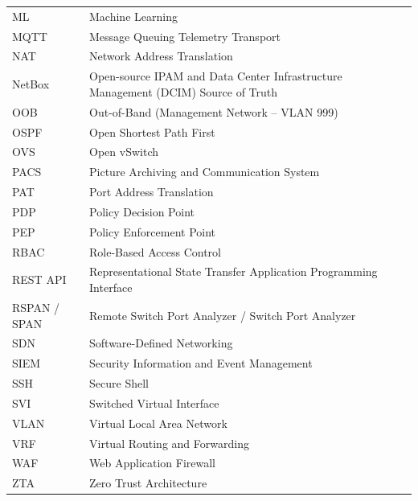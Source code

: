 \begin{longtable}{@{}p{3.4cm}p{10.8cm}@{}}
ML & Machine Learning \\
MQTT & Message Queuing Telemetry Transport \\
NAT & Network Address Translation \\
NetBox & Open-source IPAM and Data Center Infrastructure Management (DCIM) Source of Truth \\
OOB & Out-of-Band (Management Network -- VLAN 999) \\
OSPF & Open Shortest Path First \\
OVS & Open vSwitch \\
PACS & Picture Archiving and Communication System \\
PAT & Port Address Translation \\
PDP & Policy Decision Point \\
PEP & Policy Enforcement Point \\
RBAC & Role-Based Access Control \\
REST API & Representational State Transfer Application Programming Interface \\
RSPAN / SPAN & Remote Switch Port Analyzer / Switch Port Analyzer \\
SDN & Software-Defined Networking \\
SIEM & Security Information and Event Management \\
SSH & Secure Shell \\
SVI & Switched Virtual Interface \\
VLAN & Virtual Local Area Network \\
VRF & Virtual Routing and Forwarding \\
WAF & Web Application Firewall \\
ZTA & Zero Trust Architecture \\
\end{longtable}
